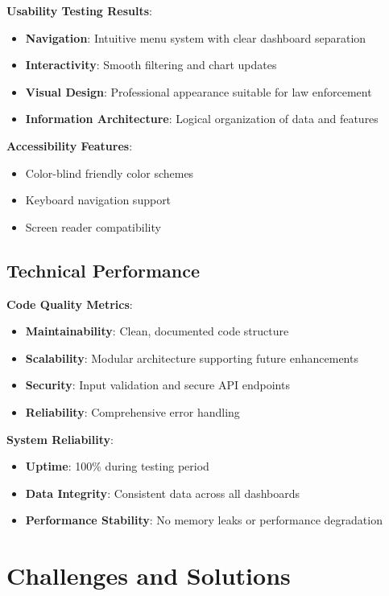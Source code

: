 \documentclass[12pt,a4paper]{article}
\begin{document}
\textbf{Usability Testing Results}:
\begin{itemize}
    \item \textbf{Navigation}: Intuitive menu system with clear dashboard separation
    \item \textbf{Interactivity}: Smooth filtering and chart updates
    \item \textbf{Visual Design}: Professional appearance suitable for law enforcement
    \item \textbf{Information Architecture}: Logical organization of data and features
\end{itemize}

\textbf{Accessibility Features}:
\begin{itemize}
    \item Color-blind friendly color schemes
    \item Keyboard navigation support
    \item Screen reader compatibility
\end{itemize}

\subsection{Technical Performance}

\textbf{Code Quality Metrics}:
\begin{itemize}
    \item \textbf{Maintainability}: Clean, documented code structure
    \item \textbf{Scalability}: Modular architecture supporting future enhancements
    \item \textbf{Security}: Input validation and secure API endpoints
    \item \textbf{Reliability}: Comprehensive error handling
\end{itemize}

\textbf{System Reliability}:
\begin{itemize}
    \item \textbf{Uptime}: 100\% during testing period
    \item \textbf{Data Integrity}: Consistent data across all dashboards
    \item \textbf{Performance Stability}: No memory leaks or performance degradation
\end{itemize}

\section{Challenges and Solutions}
\end{document}
